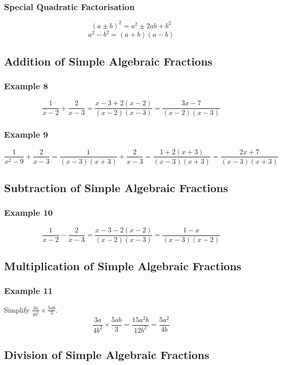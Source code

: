 \documentclass{report}
\begin{document}
\begin{flushleft}
\subsubsection{Special Quadratic Factorisation}
\begin{equation}
    (a\pm b)^2=a^2\pm2ab+b^2
\end{equation}
\begin{equation}
    a^2-b^2=(a+b)(a-b)
\end{equation}

\subsection{Addition of Simple Algebraic Fractions}
\subsubsection{Example 8}
\[
\frac{1}{x-2}+\frac{2}{x-3}=\frac{x-3+2(x-2)}{(x-2)(x-3)}=\frac{3x-7}{(x-2)(x-3)}
\]
\subsubsection{Example 9}
\[
\frac{1}{x^2-9}+\frac{2}{x-3}=\frac{1}{(x-3)(x+3)}+\frac{2}{x-3}=\frac{1+2(x+3)}{(x-3)(x+3)}=\frac{2x+7}{(x-3)(x+3)}
\]

\subsection{Subtraction of Simple Algebraic Fractions}
\subsubsection{Example 10}
\[
\frac{1}{x-2}-\frac{2}{x-3}=\frac{x-3-2(x-2)}{(x-2)(x-3)}=\frac{1-x}{(x-3)(x-2)}
\]

\subsection{Multiplication of Simple Algebraic Fractions}
\subsubsection{Example 11}
Simplify $\frac{3a}{4b^2}\times\frac{5ab}{3}$.
\[\frac{3a}{4b^2}\times\frac{5ab}{3}=\frac{15a^2b}{12b^2}=\frac{5a^2}{4b}\]

\subsection{Division of Simple Algebraic Fractions}

\end{flushleft}
\end{document}
